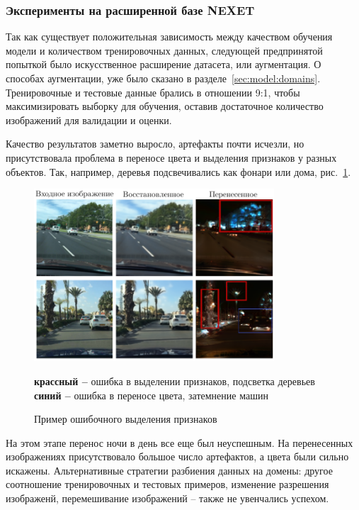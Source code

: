 \documentclass[11pt,a4paper]{extarticle}
\begin{document}
{			\subsubsection{Эксперименты на расширенной базе NEXET}\label{sec:tests:nexet_ext}
				
				Так как существует положительная зависимость между качеством обучения модели и количеством тренировочных данных, следующей предпринятой попыткой было искусственное расширение датасета, или аугментация.
				О способах аугментации, уже было сказано в разделе~\ref{sec:model:domains}.
				Тренировочные и тестовые данные брались в отношении 9:1, чтобы максимизировать выборку для обучения, оставив достаточное количество изображений для валидации и оценки.
				
				Качество результатов заметно выросло, артефакты почти исчезли, но присутствовала проблема в переносе цвета и выделения признаков у разных объектов.
				Так, например, деревья подсвечивались как фонари или дома, рис.~\ref{pic:nexet_ext}.

				\begin{figure}[ht]
					\centering
					\includegraphics[width=0.8\textwidth]{img/nexet_ext}
					\caption{Пример ошибочного выделения признаков}{
						\small{
							{\color[HTML]{CB0000} \textbf{крассный --}} ошибка в выделении признаков, подсветка деревьев \\
							{\color[HTML]{3b4daf} \textbf{синий --}} ошибка в переносе цвета, затемнение машин
						}
					}
					\label{pic:nexet_ext}
				\end{figure}
				
				\noindent
				На этом этапе перенос ночи в день все еще был неуспешным. На перенесенных изображениях присутствовало большое число артефактов, а цвета были сильно искажены.
				Альтернативные стратегии разбиения данных на домены: другое соотношение тренировочных и тестовых примеров, изменение разрешения изображенй, перемешивание изображений -- также не увенчались успехом.
				

}
\end{document}
